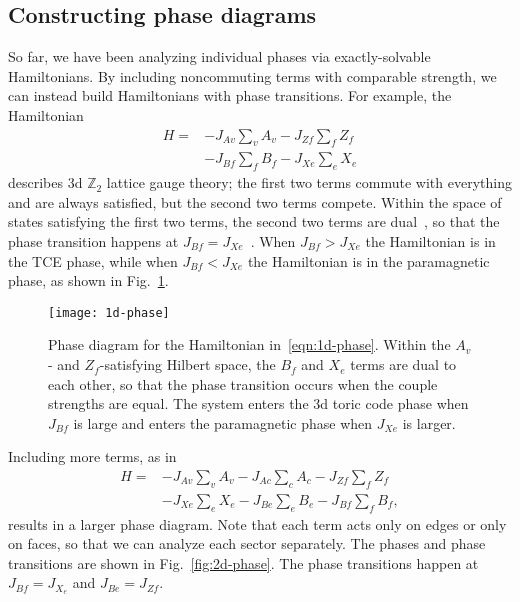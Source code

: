 \subsection{Constructing phase diagrams} \label{sub:phase-diagrams}

So far, we have been analyzing individual phases via exactly-solvable Hamiltonians.
By including noncommuting terms with comparable strength, we can instead build Hamiltonians with phase transitions. For example, the Hamiltonian
\begin{align}
H = &- J_{Av} \sum_v A_v - J_{Zf} \sum_f Z_f \nonumber\\
& - J_{Bf} \sum_f B_f - J_{Xe} \sum_e X_e \label{eqn:1d-phase}
\end{align}
describes 3d $\mathbb{Z}_2$ lattice gauge theory; the first two terms commute with everything and are always satisfied, but the second two terms compete. Within the space of states satisfying the first two terms, the second two terms are dual~\cite{FradkinSusskind, Wegner1971Duality}, so that the phase transition happens at $J_{Bf} = J_{Xe}$~\cite{Creutz1979}.  When $J_{Bf}>J_{Xe}$ the Hamiltonian is in the TCE phase, while when $J_{Bf}<J_{Xe}$ the Hamiltonian is in the paramagnetic phase, as shown in Fig.~\ref{fig:1d-phase}. 

\begin{figure}
    \centering
    \texttt{[image: 1d-phase]}
    \caption[Phase diagram for the Hamiltonian in~\eqref{eqn:1d-phase}]{Phase diagram for the Hamiltonian in~\eqref{eqn:1d-phase}. Within the $A_v$- and $Z_f$-satisfying Hilbert space, the $B_f$ and $X_e$ terms are dual to each other, so that the phase transition occurs when the couple strengths are equal. The system enters the 3d toric code phase when $J_{Bf}$ is large and enters the paramagnetic phase when $J_{Xe}$ is larger.}
    \label{fig:1d-phase}
\end{figure}

Including more terms, as in 
\begin{align}
H = &- J_{Av} \sum_v A_v - J_{Ac} \sum_c A_c - J_{Zf} \sum_f Z_f \nonumber\\
& - J_{Xe} \sum_e X_e - J_{Be} \sum_e B_e - J_{Bf} \sum_f B_f, \label{eqn:2d-phase}
\end{align}
results in a larger phase diagram. Note that each term acts only on edges or only on faces, so that we can analyze each sector separately. The phases and phase transitions are shown in Fig.~\ref{fig:2d-phase}. The phase transitions happen at $J_{Bf} = J_{X_e}$ and $J_{Be} = J_{Zf}$. 

